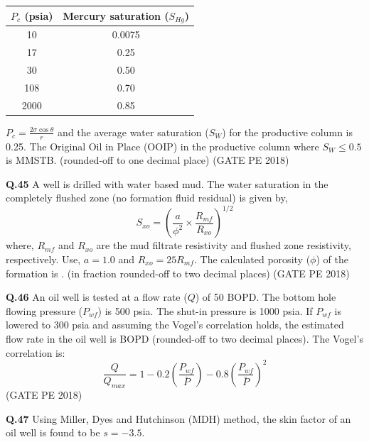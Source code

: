 \documentclass[12pt,a4paper]{article}
\begin{document}
\vspace{0.3cm}
\begin{tabular}{|c|c|}
\hline
$P_c$ (psia) & Mercury saturation ($S_{Hg}$) \\
\hline
10 & 0.0075 \\
17 & 0.25 \\
30 & 0.50 \\
108 & 0.70 \\
2000 & 0.85 \\
\hline
\end{tabular}

\vspace{0.3cm}
$P_c = \frac{2\sigma \cos \theta}{r}$ and the average water saturation ($S_W$) for the productive column is 0.25. The Original Oil in Place (OOIP) in the productive column where $S_W \leq 0.5$ is \underline{\hspace{2cm}} MMSTB. (rounded-off to one decimal place) \hfill (GATE PE 2018)

\vspace{1cm}

\noindent\textbf{Q.45} A well is drilled with water based mud. The water saturation in the completely flushed zone (no formation fluid residual) is given by, 
\[ S_{xo} = \left( \frac{a}{\phi^2} \times \frac{R_{mf}}{R_{xo}} \right)^{1/2} \]
where, $R_{mf}$ and $R_{xo}$ are the mud filtrate resistivity and flushed zone resistivity, respectively. Use, $a = 1.0$ and $R_{xo} = 25 R_{mf}$. 
The calculated porosity ($\phi$) of the formation is \underline{\hspace{2cm}}. (in fraction rounded-off to two decimal places) \hfill (GATE PE 2018)

\vspace{1cm}

\noindent\textbf{Q.46} An oil well is tested at a flow rate ($Q$) of 50 BOPD. The bottom hole flowing pressure ($P_{wf}$) is 500 psia. The shut-in pressure is 1000 psia. If $P_{wf}$ is lowered to 300 psia and assuming the Vogel's correlation holds, the estimated flow rate in the oil well is \underline{\hspace{2cm}} BOPD (rounded-off to two decimal places). The Vogel's correlation is:
\[ \frac{Q}{Q_{max}} = 1 - 0.2\left(\frac{P_{wf}}{\bar{P}}\right) - 0.8\left(\frac{P_{wf}}{\bar{P}}\right)^2 \] \hfill (GATE PE 2018)

\pagebreak

\noindent\textbf{Q.47} Using Miller, Dyes and Hutchinson (MDH) method, the skin factor of an oil well is found to be $s = -3.5$. \\ 
\end{document}
